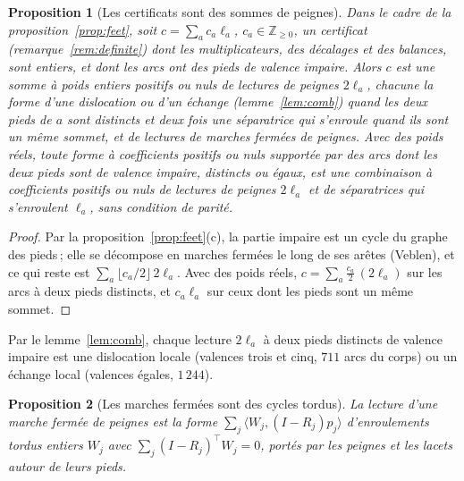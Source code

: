 \documentclass[11pt,a4paper]{article}
\newtheorem{proposition}{Proposition}
\newcommand{\Z}{\mathbb{Z}}
\newcommand{\lean}[1]{\texttt{\detokenize{#1}}}
\newenvironment{evidence}[3][]{}{}
\begin{document}
\begin{evidence}{core}{\lean{Combs.sum_of_combs}, \lean{Combs.veblen}, \lean{Combs.sum_of_combs_real}\,; la parité par la proposition~\ref{prop:feet}}
\begin{proposition}[Les certificats sont des sommes de peignes]\label{thm:combs}
Dans le cadre de la proposition~\ref{prop:feet}, soit $c = \sum_a
c_a\ell_a$, $c_a \in \Z_{\ge0}$, un certificat (remarque~\ref{rem:definite})
dont les multiplicateurs, des décalages et des balances, sont entiers, et dont
les arcs ont des pieds de valence impaire. Alors $c$ est une somme à poids
entiers positifs ou nuls de lectures de peignes $2\ell_a$, chacune la forme
d'une dislocation ou d'un échange (lemme~\ref{lem:comb}) quand les deux
pieds de $a$ sont distincts et deux fois une séparatrice qui s'enroule quand
ils sont un même sommet, et de lectures de marches fermées de peignes. Avec des poids réels, toute forme à coefficients
positifs ou nuls supportée par des arcs dont les deux pieds sont de valence
impaire, distincts ou égaux, est une combinaison à coefficients positifs ou
nuls de lectures de peignes $2\ell_a$ et de séparatrices qui s'enroulent
$\ell_a$, sans condition de parité.
\end{proposition}
\end{evidence}

\begin{proof}
Par la proposition~\ref{prop:feet}(c), la partie impaire est un cycle du
graphe des pieds\,; elle se décompose en marches fermées le long de ses
arêtes (Veblen), et ce qui reste est $\sum_a \lfloor c_a/2 \rfloor\,2\ell_a$.
Avec des poids réels, $c = \sum_a \tfrac{c_a}{2}\,(2\ell_a)$ sur les arcs à
deux pieds distincts, et $c_a\ell_a$ sur ceux dont les pieds sont un même
sommet.
\end{proof}

Par le lemme~\ref{lem:comb}, chaque lecture $2\ell_a$ à deux pieds distincts
de valence impaire est une dislocation locale (valences trois et cinq, $711$
arcs du corps) ou un échange local (valences égales, $1\,244$).

\begin{evidence}{prose}{démonstration sur le papier, non vérifiée sur les données}
\begin{proposition}[Les marches fermées sont des cycles tordus]\label{prop:walks}
La lecture d'une marche fermée de peignes est la forme $\sum_j \langle W_j,
(I - R_j)p_j\rangle$ d'enroulements tordus entiers $W_j$ avec $\sum_j (I -
R_j)^\top W_j = 0$, portés par les peignes et les lacets autour de leurs
pieds.
\end{proposition}
\end{evidence}
\end{document}
